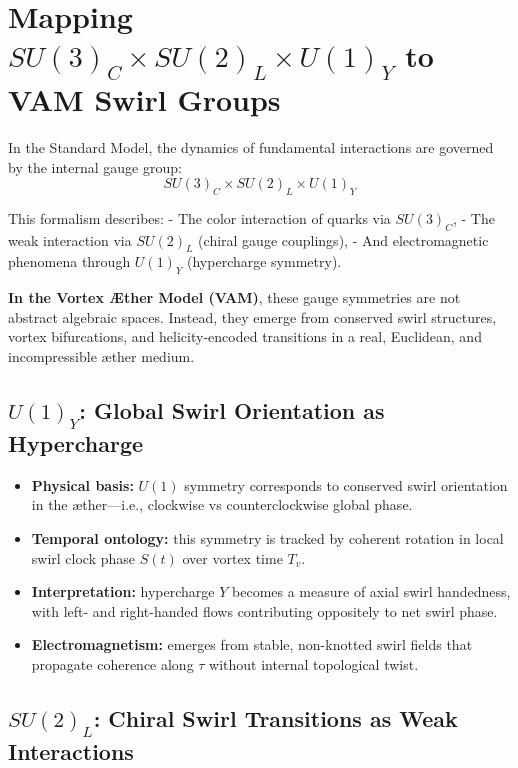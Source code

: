 \section{Mapping \texorpdfstring{$SU(3)_C \times SU(2)_L \times U(1)_Y$}{SU(3) x SU(2) x U(1)} to VAM Swirl Groups}

In the Standard Model, the dynamics of fundamental interactions are governed by the internal gauge group:
\[
SU(3)_C \times SU(2)_L \times U(1)_Y
\]

This formalism describes:
- The color interaction of quarks via $SU(3)_C$,
- The weak interaction via $SU(2)_L$ (chiral gauge couplings),
- And electromagnetic phenomena through $U(1)_Y$ (hypercharge symmetry).

\textbf{In the Vortex \AE{}ther Model (VAM)}, these gauge symmetries are not abstract algebraic spaces. Instead, they emerge from conserved swirl structures, vortex bifurcations, and helicity-encoded transitions in a real, Euclidean, and incompressible æther medium.

\subsection{$U(1)_Y$: Global Swirl Orientation as Hypercharge}

\begin{itemize}
    \item \textbf{Physical basis:} $U(1)$ symmetry corresponds to conserved swirl orientation in the æther—i.e., clockwise vs counterclockwise global phase.
    \item \textbf{Temporal ontology:} this symmetry is tracked by coherent rotation in local swirl clock phase $S(t)$ over vortex time $T_v$.
    \item \textbf{Interpretation:} hypercharge $Y$ becomes a measure of axial swirl handedness, with left- and right-handed flows contributing oppositely to net swirl phase.
    \item \textbf{Electromagnetism:} emerges from stable, non-knotted swirl fields that propagate coherence along $\tau$ without internal topological twist.
\end{itemize}

\subsection{$SU(2)_L$: Chiral Swirl Transitions as Weak Interactions}

